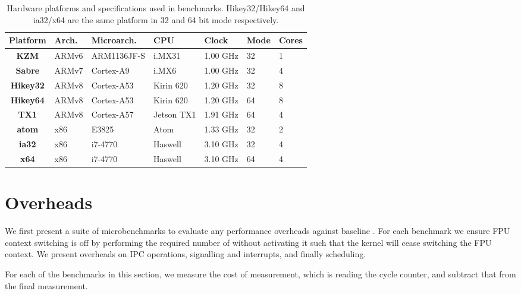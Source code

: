 \begin{table}[ht]\centering
\begin{tabular}{|c|l|l|l|l|l|l|}\hline
    \textbf{Platform} & \textbf{Arch.} & \textbf{Microarch.} & \textbf{CPU} & \textbf{Clock} & \textbf{Mode} & \textbf{Cores} \\\hline
    \textbf{KZM}  & ARMv6          & ARM1136JF-S          & i.MX31       & 1.00 GHz         & 32  &  1 \\\hline
    \textbf{Sabre} & ARMv7          & Cortex-A9           & i.MX6        & 1.00 GHz         & 32  & 4 \\\hline
    \textbf{Hikey32} & ARMv8          & Cortex-A53          & Kirin 620    & 1.20 GHz         & 32  & 8 \\\hline
    \textbf{Hikey64} & ARMv8          & Cortex-A53          & Kirin 620    & 1.20 GHz         & 64  & 8 \\\hline
    \textbf{TX1}  & ARMv8          & Cortex-A57          & Jetson TX1   & 1.91 GHz         & 64  & 4 \\\hline
    \textbf{atom} & x86            & E3825               & Atom         & 1.33 GHz         & 32  & 2 \\\hline
    \textbf{ia32} & x86            & i7-4770             & Haswell      & 3.10 GHz         & 32  & 4 \\\hline
    \textbf{x64}  & x86            & i7-4770             & Haswell      & 3.10 GHz         & 64  & 4 \\\hline
\end{tabular}
\caption{Hardware platforms and specifications used in benchmarks. Hikey32/Hikey64 and ia32/x64 are the
same platform in 32 and 64 bit mode respectively.}
\label{t:evaluation-hardware}
\end{table}

\section{Overheads}

We first present a suite of microbenchmarks to evaluate any performance overheads against baseline
\selfour.
For each benchmark we ensure \gls{FPU} context switching is off by performing the required number of
without activating it such that the kernel will cease switching the FPU context. We present
overheads on IPC operations, signalling and interrupts, and finally scheduling. 

For each of the benchmarks in this section, we measure the cost of measurement, which is reading the
cycle counter, and subtract that from the final measurement.

